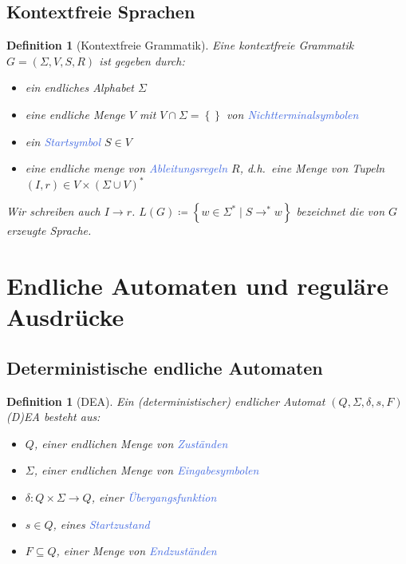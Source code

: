 \documentclass[11pt]{scrartcl}
\newcommand{\tcol}[1]{\textcolor{RoyalBlue}{#1}}
\newcommand{\set}[1]{\left\lbrace #1\right\rbrace}
\theoremstyle{break}
\newtheorem{defi}[satz]{Definition}
\begin{document}
    \subsection{Kontextfreie Sprachen}
	\label{subsec:kontextfreie-sprachen}

    \begin{defi}[Kontextfreie Grammatik]
        Eine kontextfreie Grammatik $G=(\Sigma ,V,S,R)$ ist gegeben durch:
        \begin{itemize}
            \item ein endliches Alphabet $\Sigma$
            \item eine endliche Menge $V$ mit $V\cap\Sigma = \set{}$ von \tcol{Nichtterminalsymbolen}
            \item ein \tcol{Startsymbol} $S\in V$
            \item eine endliche menge von \tcol{Ableitungsregeln} $R$, d.h.\ eine Menge von Tupeln $(I,r)\in V\times (\Sigma\cup V)^*$
        \end{itemize}
        Wir schreiben auch $I\rightarrow r$. $L(G)\coloneqq \set{w\in\Sigma^*\mid S\rightarrow^*w}$ bezeichnet die von $G$ erzeugte Sprache.
    \end{defi}



    \section{Endliche Automaten und reguläre Ausdrücke}
	\label{sec:endliche-automaten-und-reguläre-ausdrücke}


    \subsection{Deterministische endliche Automaten}
	\label{subsec:deterministische-endliche-automaten}

    \begin{defi}[DEA]
        Ein (deterministischer) endlicher Automat $(Q,\Sigma ,\delta ,s,F)$ (D)EA besteht aus:
        \begin{itemize}
            \item $Q$, einer endlichen Menge von \tcol{Zuständen}
            \item $\Sigma$, einer endlichen Menge von \tcol{Eingabesymbolen}
            \item $\delta\colon Q\times\Sigma\to Q$, einer \tcol{Übergangsfunktion}
            \item $s\in Q$, eines \tcol{Startzustand}
            \item $F\subseteq Q$, einer Menge von \tcol{Endzuständen}
        \end{itemize}
    \end{defi}
\end{document}
